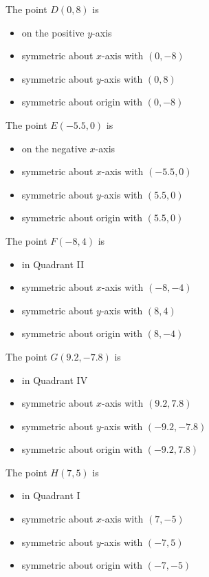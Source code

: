 {The point $D(0, 8)$ is 

\begin{itemize}

\item on the positive $y$-axis
\item symmetric about $x$-axis with $(0, -8)$
\item symmetric about $y$-axis with $(0, 8)$
\item symmetric about origin with $(0, -8)$

\end{itemize}

The point $E(-5.5, 0)$ is 

\begin{itemize}

\item on the negative $x$-axis
\item symmetric about $x$-axis with $(-5.5, 0)$
\item symmetric about $y$-axis with $(5.5, 0)$
\item symmetric about origin with $(5.5, 0)$

\end{itemize}


The point $F(-8, 4)$ is 

\begin{itemize}

\item in Quadrant II
\item symmetric about $x$-axis with $(-8, -4)$
\item symmetric about $y$-axis with $(8, 4)$
\item symmetric about origin with $(8, -4)$

\end{itemize}

The point $G(9.2, -7.8)$ is 

\begin{itemize}

\item in Quadrant IV
\item symmetric about $x$-axis with $(9.2, 7.8)$
\item symmetric about $y$-axis with {\scriptsize $(-9.2, -7.8)$}
\item symmetric about origin with $(-9.2, 7.8)$

\end{itemize}

The point $H(7, 5)$ is 

\begin{itemize}

\item in Quadrant I
\item symmetric about $x$-axis with $(7, -5)$
\item symmetric about $y$-axis with $(-7, 5)$
\item symmetric about origin with $(-7, -5)$

\end{itemize}}